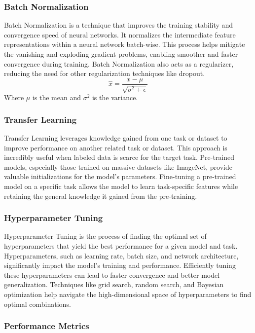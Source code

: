 \subsubsection*{Batch Normalization}

Batch Normalization is a technique that improves the training stability and convergence speed of neural networks. It normalizes the intermediate feature representations within a neural network batch-wise. This process helps mitigate the vanishing and exploding gradient problems, enabling smoother and faster convergence during training. Batch Normalization also acts as a regularizer, reducing the need for other regularization techniques like dropout.
\[ \hat{x} = \frac{x - \mu}{\sqrt{\sigma^2 + \epsilon}} \]
Where \( \mu \) is the mean and \( \sigma^2 \) is the variance.

\subsubsection*{Transfer Learning}

Transfer Learning leverages knowledge gained from one task or dataset to improve performance on another related task or dataset. This approach is incredibly useful when labeled data is scarce for the target task. Pre-trained models, especially those trained on massive datasets like ImageNet, provide valuable initializations for the model's parameters. Fine-tuning a pre-trained model on a specific task allows the model to learn task-specific features while retaining the general knowledge it gained from the pre-training.
\subsubsection*{Hyperparameter Tuning}

Hyperparameter Tuning is the process of finding the optimal set of hyperparameters that yield the best performance for a given model and task. Hyperparameters, such as learning rate, batch size, and network architecture, significantly impact the model's training and performance. Efficiently tuning these hyperparameters can lead to faster convergence and better model generalization. Techniques like grid search, random search, and Bayesian optimization help navigate the high-dimensional space of hyperparameters to find optimal combinations.
\subsubsection*{Performance Metrics}

